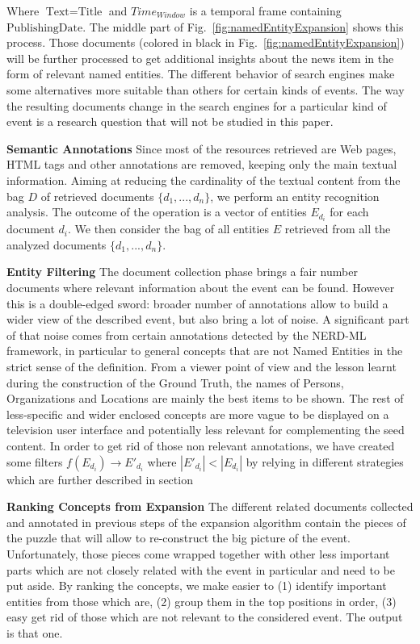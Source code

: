 \documentclass{llncs}
\begin{document}
Where $\text{Text}=\text{Title}$ and $Time_{Window}$ is a temporal frame containing $\text{PublishingDate}$. The middle part of Fig.~\ref{fig:namedEntityExpansion} shows this process. Those documents (colored in black in Fig.~\ref{fig:namedEntityExpansion}) will be further processed to get additional insights about the news item in the form of relevant named entities. The different behavior of search engines make some alternatives more suitable than others for certain kinds of events. The way the resulting documents change in the search engines for a particular kind of event is a research question that will not be studied in this paper. 

{\bf Semantic Annotations} Since most of the resources retrieved are Web pages, HTML tags and other annotations are removed, keeping only the main textual information. Aiming at reducing the cardinality of the textual content from the bag $D$ of retrieved documents $\{d_1, ..., d_n\}$, we perform an entity recognition analysis. The outcome of the operation is a vector of entities $E_{d_i}$ for each document $d_i$. We then consider the bag of all entities $E$ retrieved from all the analyzed documents $\{d_1, ..., d_n\}$. 

{\bf Entity Filtering} The document collection phase brings a fair number documents where relevant information about the event can be found. However this is a double-edged sword: broader number of annotations allow to build a wider view of the described event, but also bring a lot of noise. A significant part of that noise comes from certain annotations detected by the NERD-ML framework, in particular to general concepts that are not Named Entities in the strict sense of the definition. From a viewer point of view and the lesson learnt during the construction of the Ground Truth, the names of Persons, Organizations and Locations are mainly the best items to be shown. The rest of less-specific and wider enclosed concepts are more vague to be displayed on a television user interface and potentially less relevant for complementing the seed content. In order to get rid of those non relevant annotations, we have created some filters $f\left (  E_{d_i}\right )\rightarrow  E'_{d_i}$ where $\left |E'_{d_i}  \right | < \left |E_{d_i}  \right |$ by relying in different strategies which are further described in section 

{\bf Ranking Concepts from Expansion}
The different related documents collected and annotated in previous steps of the expansion algorithm contain the pieces of the puzzle that will allow to re-construct the big picture of the event. Unfortunately, those pieces come wrapped together with other less important parts which are not closely related with the event in particular and need to be put aside. By ranking the concepts, we make easier to (1) identify important entities from those which are, (2) group them in the top positions in order, (3) easy get rid of those which are not relevant to the considered event.
The output is that one.
\end{document}
